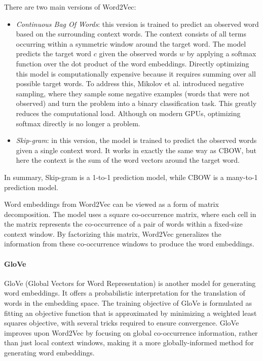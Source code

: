 There are two main versions of Word2Vec:
\begin{itemize}
    \item \textit{Continuous Bag Of Words}: this version is trained to predict an observed word based on the surrounding context words. 
        The context consists of all terms occurring within a symmetric window around the target word. 
        The model predicts the target word $c$ given the observed words $w$ by applying a softmax function over the dot product of the word embeddings. 
        Directly optimizing this model is computationally expensive because it requires summing over all possible target words.
        To address this, Mikolov et al. introduced negative sampling, where they sample some negative examples (words that were not observed) and turn the problem into a binary classification task. 
        This greatly reduces the computational load. Although on modern GPUs, optimizing softmax directly is no longer a problem.
    \item \textit{Skip-gram}: in this version, the model is trained to predict the observed words given a single context word.
        It works in exactly the same way as CBOW, but here the context is the sum of the word vectors around the target word.
\end{itemize}
\noindent In summary, Skip-gram is a 1-to-1 prediction model, while CBOW is a many-to-1 prediction model.

Word embeddings from Word2Vec can be viewed as a form of matrix decomposition.
The model uses a square co-occurrence matrix, where each cell in the matrix represents the co-occurrence of a pair of words within a fixed-size context window. 
By factorizing this matrix, Word2Vec generalizes the information from these co-occurrence windows to produce the word embeddings.

\paragraph*{GloVe}
GloVe (Global Vectors for Word Representation) is another model for generating word embeddings. 
It offers a probabilistic interpretation for the translation of words in the embedding space. 
The training objective of GloVe is formulated as fitting an objective function that is approximated by minimizing a weighted least squares objective, with several tricks required to ensure convergence.
GloVe improves upon Word2Vec by focusing on global co-occurrence information, rather than just local context windows, making it a more globally-informed method for generating word embeddings.

